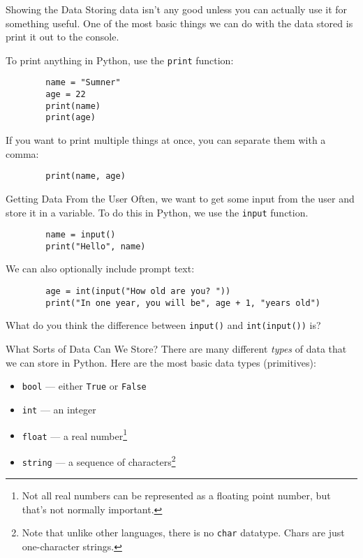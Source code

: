 \documentclass{acm}
\begin{document}
\begin{frame}[fragile]{Showing the Data}
    Storing data isn't any good unless you can actually use it for something
    useful. \pause One of the most basic things we can do with the data stored
    is print it out to the console.

    To print anything in Python, use the \texttt{print} function:
    \begin{verbatim}
        name = "Sumner"
        age = 22
        print(name)
        print(age)
    \end{verbatim}

    \pause
    If you want to print multiple things at once, you can separate them with a
    comma:
    \begin{verbatim}
        print(name, age)
    \end{verbatim}
\end{frame}

\begin{frame}[fragile]{Getting Data From the User}
    Often, we want to get some input from the user and store it in a variable.
    \pause To do this in Python, we use the \texttt{input} function.

    \begin{verbatim}
        name = input()
        print("Hello", name)
    \end{verbatim}

    \pause
    We can also optionally include prompt text:
    \begin{verbatim}
        age = int(input("How old are you? "))
        print("In one year, you will be", age + 1, "years old")
    \end{verbatim}

    \pause
    What do you think the difference between \texttt{input()} and
    \texttt{int(input())} is?
\end{frame}

\begin{frame}{What Sorts of Data Can We Store?}
    There are many different \textit{types} of data that we can store in Python.
    Here are the most basic data types (primitives):

    \begin{itemize}
        \item \texttt{bool} --- either \texttt{True} or \texttt{False}
        \item \texttt{int} --- an integer
        \item \texttt{float} --- a real number\footnote[frame]{Not all real
            numbers can be represented as a floating point number, but that's
            not normally important.}
        \item \texttt{string} --- a sequence of characters\footnote[frame]{Note
            that unlike other languages, there is no \texttt{char} datatype.
            Chars are just one-character strings.}
    \end{itemize}
\end{frame}
\end{document}
